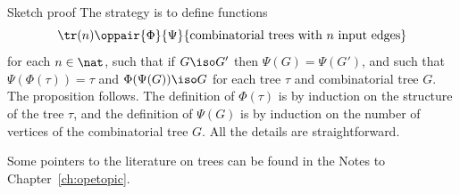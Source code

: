 \begin{prooflike}{Sketch proof}
The strategy is to define functions 
\[
\tr(n) \oppair{\Phi}{\Psi} 
\{ \textrm{combinatorial trees with } n \textrm{ input edges} \}
\]
for each $n\in\nat$, such that if $G \iso G'$ then $\Psi(G) =
\Psi(G')$, and such that $\Psi(\Phi(\tau)) = \tau$ and $\Phi(\Psi(G))
\iso G$ for each tree $\tau$ and combinatorial tree $G$.  The proposition
follows.  The definition of $\Phi(\tau)$ is by induction on the structure
of the tree $\tau$, and the definition of $\Psi(G)$ is by induction on the
number of vertices of the combinatorial tree $G$.  All the details are
straightforward. 
% 
\done
\end{prooflike}



\begin{notes}

Some pointers to the literature on trees can be found in the Notes to
Chapter~\ref{ch:opetopic}.%
%
%
%
% 



\end{notes}
